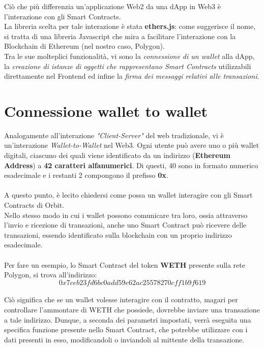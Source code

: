 \documentclass[12pt,a4paper]{report}
\begin{document}
Ciò che più differenzia un'applicazione Web2 da una dApp in Web3 è l'interazione con gli Smart Contracts.\\La libreria scelta per tale interazione è stata \textbf{ethers.js}\cite{ethers}: come suggerisce il nome, si tratta di una libreria Javascript che mira a facilitare l'interazione con la Blockchain di Ethereum (nel nostro caso, Polygon).
\\Tra le sue molteplici funzionalità, vi sono la \textit{connessione di un wallet} alla dApp, la \textit{creazione di istanze di oggetti che rappresentano Smart Contracts} utilizzabili direttamente nel Frontend ed infine la \textit{firma dei messaggi relativi alle transazioni}.

\section{Connessione wallet to wallet}

Analogamente all'interazione \textit{"Client-Server"} del web tradizionale, vi è un'interazione \textit{Wallet-to-Wallet} nel Web3. Ogni utente può avere uno o più wallet digitali, ciascuno dei quali viene identificato da un indirizzo (\textbf{Ethereum Address}) a \textbf{42 caratteri alfanumerici}. Di questi, 40 sono in formato numerico esadecimale e i restanti 2 compongono il prefisso \textbf{0x}.
\\\\A questo punto, è lecito chiedersi come possa un wallet interagire con gli Smart Contracts di Orbit.\\
Nello stesso modo in cui i wallet possono comunicare tra loro, ossia attraverso l'invio e ricezione di transazioni, anche uno Smart Contract può ricevere delle transazioni, essendo identificato sulla blockchain con un proprio indirizzo esadecimale.
\\\\Per fare un esempio, lo Smart Contract del token \textbf{WETH} presente sulla rete Polygon, si trova all'indirizzo:\\
\[ 0x7ceb23fd6bc0add59e62ac25578270cff1b9f619 \]
\\Ciò significa che se un wallet volesse interagire con il contratto, magari per controllare l'ammontare di WETH che possiede, dovrebbe inviare una transazione a tale indirizzo. Dunque, a seconda dei parametri impostati, verrà eseguita una specifica funzione presente nello Smart Contract, che potrebbe utilizzare con i dati presenti in esso, modificandoli o inviandoli al mittente della transazione.
\end{document}
